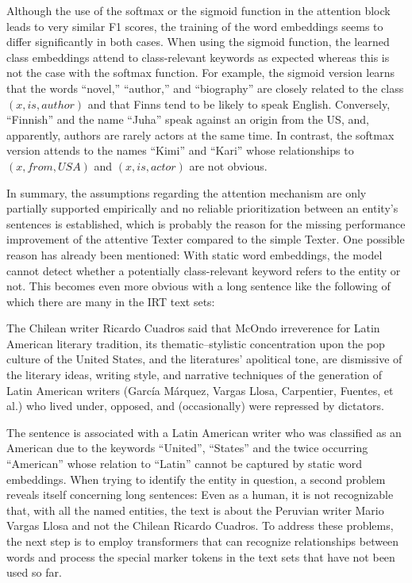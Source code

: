 Although the use of the softmax or the sigmoid function in the attention block leads to very similar F1 scores, the training of the word embeddings seems to differ significantly in both cases. When using the sigmoid function, the learned class embeddings attend to class-relevant keywords as expected whereas this is not the case with the softmax function. For example, the sigmoid version learns that the words ``novel,'' ``author,'' and ``biography'' are closely related to the class $(x, is, author)$ and that Finns tend to be likely to speak English. Conversely, ``Finnish'' and the name ``Juha'' speak against an origin from the US, and, apparently, authors are rarely actors at the same time. In contrast, the softmax version attends to the names ``Kimi'' and ``Kari'' whose relationships  to $(x, from, USA)$ and $(x, is, actor)$ are not obvious.

In summary, the assumptions regarding the attention mechanism are only partially supported empirically and no reliable prioritization between an entity's sentences is established, which is probably the reason for the missing performance improvement of the attentive Texter compared to the simple Texter. One possible reason has already been mentioned: With static word embeddings, the model cannot detect whether a potentially class-relevant keyword refers to the entity or not. This becomes even more obvious with a long sentence like the following of which there are many in the IRT text sets:

\begin{displayquote}
    The Chilean writer Ricardo Cuadros said that McOndo irreverence for Latin American literary tradition, its thematic–stylistic concentration upon the pop culture of the United States, and the literatures’ apolitical tone, are dismissive of the literary ideas, writing style, and narrative techniques of the generation of Latin American writers (García Márquez, Vargas Llosa, Carpentier, Fuentes, et al.) who lived under, opposed, and (occasionally) were repressed by dictators.
\end{displayquote}

The sentence is associated with a Latin American writer who was classified as an American due to the keywords ``United'', ``States'' and the twice occurring ``American'' whose relation to ``Latin'' cannot be captured by static word embeddings. When trying to identify the entity in question, a second problem reveals itself concerning long sentences: Even as a human, it is not recognizable that, with all the named entities, the text is about the Peruvian writer Mario Vargas Llosa and not the Chilean Ricardo Cuadros. To address these problems, the next step is to employ transformers that can recognize relationships between words and process the special marker tokens in the text sets that have not been used so far.
